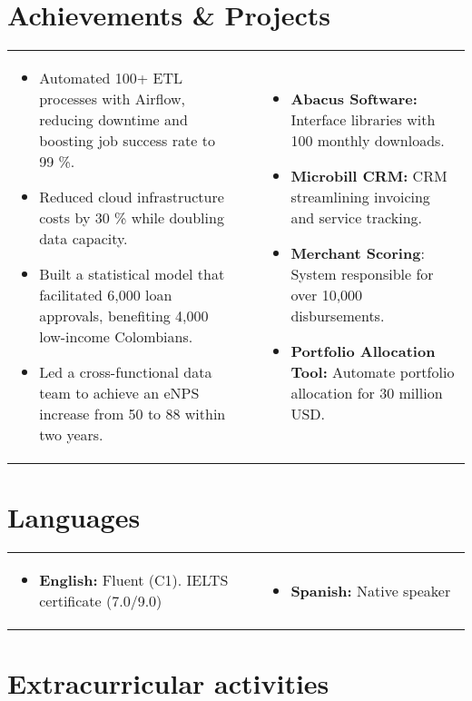 \documentclass[11pt, letterpaper, sans]{moderncv}
\begin{document}
\section{Achievements \& Projects}
{
    \center
    \begin{tabular}{p{0.5\linewidth}p{0.05\linewidth}p{0.45\linewidth}}
        \begin{itemize}
            \item Automated 100+ ETL processes with {\color{color3} Airflow}, reducing downtime and boosting job success rate to 99 \%.
            \item Reduced cloud infrastructure costs by 30 \% while doubling data capacity.
            \item Built a statistical model that facilitated 6,000 loan approvals, benefiting 4,000 low-income Colombians.
            \item Led a cross-functional data team to achieve an eNPS increase from 50 to 88 within two years.
        \end{itemize}
        &
        & 
        \begin{itemize}
            \item \textbf{Abacus Software:} Interface libraries with 100 monthly downloads.
            \item \textbf{Microbill CRM:} CRM streamlining invoicing and service tracking.
            \item \textbf{Merchant Scoring}: System responsible for over 10,000 disbursements.
            \item \textbf{Portfolio Allocation Tool:} Automate portfolio allocation for 30 million USD.
        \end{itemize}
    \end{tabular}
}

\section{Languages}
{
    \center
    \begin{tabular}{p{0.5\linewidth}p{0.05\linewidth}p{0.45\linewidth}}
        \begin{itemize}
	       \item \textbf{English:} Fluent (C1). IELTS certificate (7.0/9.0)
        \end{itemize}
        &
        & 
        \begin{itemize}  
	       \item \textbf{Spanish:} Native speaker
        \end{itemize}
    \end{tabular}
}

\section{Extracurricular activities}
    
\end{document}
